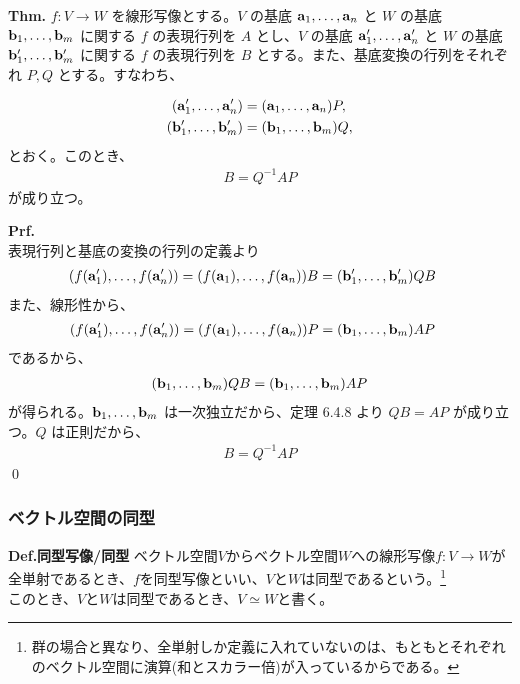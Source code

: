 \documentclass[a4paper,11pt]{jsarticle}
\numberwithin{equation}{section}
\begin{document}
\begin{itembox}[l]{\textbf{Thm.}}
  $f: V \to W$ を線形写像とする。$V$ の基底 $\vb{a}_1, \dots, \vb{a}_n$ と $W$ の基底 $\vb{b}_1, \dots, \vb{b}_m$ に関する $f$ の表現行列を $A$ とし、$V$ の基底 $\vb{a}_1', \dots, \vb{a}_n'$ と $W$ の基底 $\vb{b}_1', \dots, \vb{b}_m'$ に関する $f$ の表現行列を $B$ とする。また、基底変換の行列をそれぞれ $P, Q$ とする。すなわち、
  
  \begin{align}
      (\vb{a}_1', \dots, \vb{a}_n') &= (\vb{a}_1, \dots, \vb{a}_n) P, \\
      (\vb{b}_1', \dots, \vb{b}_m') &= (\vb{b}_1, \dots, \vb{b}_m) Q,
  \end{align}
  とおく。このとき、
  \begin{align}
  B = Q^{-1} A P
  \end{align}
  が成り立つ。
  \end{itembox}
  \textbf{Prf.}\\
  表現行列と基底の変換の行列の定義より
  \begin{align}
  (f(\vb{a}_1'), \dots, f(\vb{a}_n')) &= (f(\vb{a}_1), \dots, f(\vb{a}_n)) B = (\vb{b}_1', \dots, \vb{b}_m') QB
  \end{align}
  また、線形性から、
  \begin{align}
  (f(\vb{a}_1'), \dots, f(\vb{a}_n')) &= (f(\vb{a}_1), \dots, f(\vb{a}_n)) P = (\vb{b}_1, \dots, \vb{b}_m) AP
  \end{align}
  であるから、
  \begin{align}
  (\vb{b}_1, \dots, \vb{b}_m) QB = (\vb{b}_1, \dots, \vb{b}_m) AP
  \end{align}
  が得られる。$\vb{b}_1, \dots, \vb{b}_m$ は一次独立だから、定理 6.4.8 より $QB = AP$ が成り立つ。$Q$ は正則だから、
  \begin{align}
  B = Q^{-1} A P
  \end{align}
\qed

\subsubsection{ベクトル空間の同型}

\begin{itembox}[l]{\textbf{Def.同型写像/同型}}
  ベクトル空間$V$からベクトル空間$W$への線形写像$f:V \to W$が全単射であるとき、$f$を同型写像といい、$V$と$W$は同型であるという。\footnote{群の場合と異なり、全単射しか定義に入れていないのは、もともとそれぞれのベクトル空間に演算(和とスカラー倍)が入っているからである。}\\
  このとき、$V$と$W$は同型であるとき、$V \simeq W$と書く。
\end{itembox}
\end{document}
